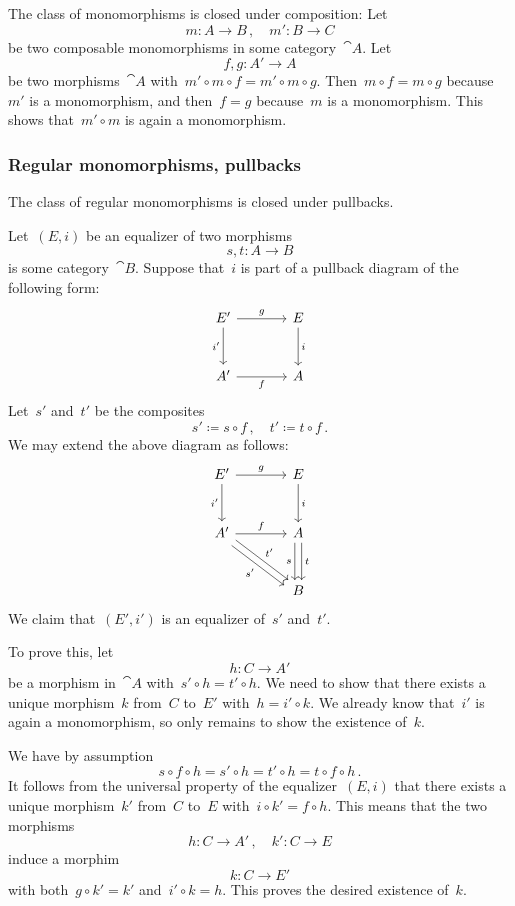 The class of monomorphisms is closed under composition:
Let
\[
	m \colon A \to B \,,
	\quad
	m' \colon B \to C
\]
be two composable monomorphisms in some category~$\cat{A}$.
Let
\[
	f, g \colon A' \to A
\]
be two morphisms~$\cat{A}$ with~$m' ∘ m ∘ f = m' ∘ m ∘ g$.
Then~$m ∘ f = m ∘ g$ because~$m'$ is a monomorphism, and then~$f = g$ because~$m$ is a monomorphism.
This shows that~$m' ∘ m$ is again a monomorphism.



\subsubsection*{Regular monomorphisms, pullbacks}

The class of regular monomorphisms is closed under pullbacks.

Let~$(E, i)$ be an equalizer of two morphisms
\[
	s, t \colon A \to B
\]
is some category~$\cat{B}$.
Suppose that~$i$ is part of a pullback diagram of the following form:
\[
	\begin{tikzcd}[sep = large]
		E'
		\arrow{r}[above]{g}
		\arrow{d}[left]{i'}
		&
		E
		\arrow{d}[right]{i}
		\\
		A'
		\arrow{r}[below]{f}
		&
		A
	\end{tikzcd}
\]
Let~$s'$ and~$t'$ be the composites
\[
	s' ≔ s ∘ f \,,
	\quad
	t' ≔ t ∘ f \,.
\]
We may extend the above diagram as follows:
\[
	\begin{tikzcd}[sep = large]
		E'
		\arrow{r}[above]{g}
		\arrow{d}[left]{i'}
		&
		E
		\arrow{d}[right]{i}
		\\
		A'
		\arrow{r}[above]{f}
		\arrow[shift right]{dr}[below left]{s'}
		\arrow[shift left]{dr}[above right]{t'}
		&
		A
		\arrow[shift right]{d}[left]{s}
		\arrow[shift left]{d}[right]{t}
		\\
		{}
		&
		B
	\end{tikzcd}
\]
We claim that~$(E', i')$ is an equalizer of~$s'$ and~$t'$.

To prove this, let
\[
	h \colon C \to A'
\]
be a morphism in~$\cat{A}$ with~$s' ∘ h = t' ∘ h$.
We need to show that there exists a unique morphism~$k$ from~$C$ to~$E'$ with~$h = i' ∘ k$.
We already know that~$i'$ is again a monomorphism, so only remains to show the existence of~$k$.

We have by assumption
\[
	s ∘ f ∘ h
	=
	s' ∘ h
	=
	t' ∘ h
	=
	t ∘ f ∘ h \,.
\]
It follows from the universal property of the equalizer~$(E, i)$ that there exists a unique morphism~$k'$ from~$C$ to~$E$ with~$i ∘ k' = f ∘ h$.
This means that the two morphisms
\[
	h \colon C \to A' \,,
	\quad
	k' \colon C \to E
\]
induce a morphim
\[
	k \colon C \to E'
\]
with both~$g ∘ k' = k'$ and~$i' ∘ k = h$.
This proves the desired existence of~$k$.

